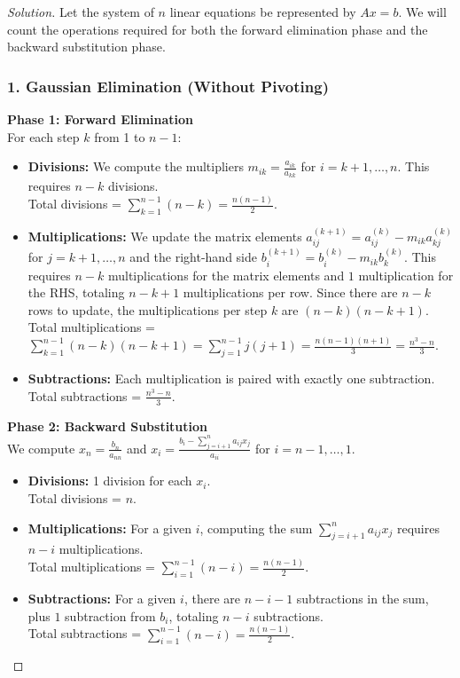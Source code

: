 \documentclass[11pt, a4paper]{article}
\newif\ifsolutionnewpage
\newenvironment{solution}
  {\begin{proof}[Solution]}
  {\end{proof}\ifsolutionnewpage\newpage\fi}
\begin{document}
\begin{solution}
    Let the system of $n$ linear equations be represented by $Ax = b$. We will count the operations required for both the forward elimination phase and the backward substitution phase.

    \subsubsection*{1. Gaussian Elimination (Without Pivoting)}
    \textbf{Phase 1: Forward Elimination} \\
    For each step $k$ from 1 to $n-1$:
    \begin{itemize}
        \item \textbf{Divisions:} We compute the multipliers $m_{ik} = \frac{a_{ik}}{a_{kk}}$ for $i = k+1, \dots, n$. This requires $n-k$ divisions. \\
        Total divisions = $\sum_{k=1}^{n-1} (n-k) = \frac{n(n-1)}{2}$.
        
        \item \textbf{Multiplications:} We update the matrix elements $a_{ij}^{(k+1)} = a_{ij}^{(k)} - m_{ik}a_{kj}^{(k)}$ for $j = k+1, \dots, n$ and the right-hand side $b_i^{(k+1)} = b_i^{(k)} - m_{ik}b_k^{(k)}$. This requires $n-k$ multiplications for the matrix elements and $1$ multiplication for the RHS, totaling $n-k+1$ multiplications per row. Since there are $n-k$ rows to update, the multiplications per step $k$ are $(n-k)(n-k+1)$. \\
        Total multiplications = $\sum_{k=1}^{n-1} (n-k)(n-k+1) = \sum_{j=1}^{n-1} j(j+1) = \frac{n(n-1)(n+1)}{3} = \frac{n^3-n}{3}$.
        
        \item \textbf{Subtractions:} Each multiplication is paired with exactly one subtraction. \\
        Total subtractions = $\frac{n^3-n}{3}$.
    \end{itemize}

    \textbf{Phase 2: Backward Substitution} \\
    We compute $x_n = \frac{b_n}{a_{nn}}$ and $x_i = \frac{b_i - \sum_{j=i+1}^n a_{ij}x_j}{a_{ii}}$ for $i = n-1, \dots, 1$.
    \begin{itemize}
        \item \textbf{Divisions:} 1 division for each $x_i$. \\
        Total divisions = $n$.
        \item \textbf{Multiplications:} For a given $i$, computing the sum $\sum_{j=i+1}^n a_{ij}x_j$ requires $n-i$ multiplications. \\
        Total multiplications = $\sum_{i=1}^{n-1} (n-i) = \frac{n(n-1)}{2}$.
        \item \textbf{Subtractions:} For a given $i$, there are $n-i-1$ subtractions in the sum, plus $1$ subtraction from $b_i$, totaling $n-i$ subtractions. \\
        Total subtractions = $\sum_{i=1}^{n-1} (n-i) = \frac{n(n-1)}{2}$.
    \end{itemize}


\end{solution}
\end{document}
